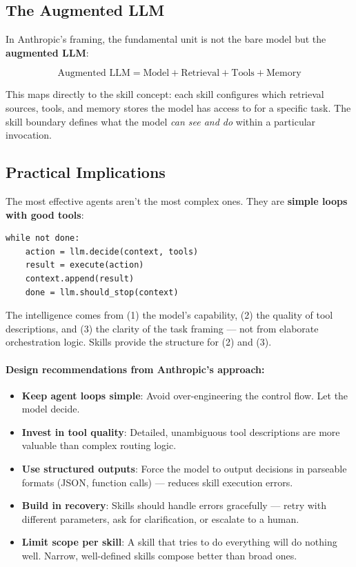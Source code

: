 \subsection{The Augmented LLM}
\label{the-augmented-llm}

In Anthropic’s framing, the fundamental unit is not the bare model but the \textbf{augmented LLM}:

\[
\text{Augmented LLM} = \text{Model} + \text{Retrieval} + \text{Tools} + \text{Memory}
\]

This maps directly to the skill concept: each skill configures which retrieval sources, tools, and memory stores the model has access to for a specific task. The skill boundary defines what the model \emph{can see and do} within a particular invocation.

\subsection{Practical Implications}
\label{practical-implications}

\begin{intuitionbox}
The most effective agents aren’t the most complex ones. They are \textbf{simple loops with good tools}:

\begin{lstlisting}[style=pythonstyle]
while not done:
    action = llm.decide(context, tools)
    result = execute(action)
    context.append(result)
    done = llm.should_stop(context)
\end{lstlisting}

The intelligence comes from (1) the model’s capability, (2) the quality of tool descriptions, and (3) the clarity of the task framing --- not from elaborate orchestration logic. Skills provide the structure for (2) and (3).
\end{intuitionbox}

\paragraph{Design recommendations from Anthropic’s approach:}
\label{design-recommendations-from-anthropics-approach}

\begin{itemize}
  \item \textbf{Keep agent loops simple}: Avoid over-engineering the control flow. Let the model decide.
  \item \textbf{Invest in tool quality}: Detailed, unambiguous tool descriptions are more valuable than complex routing logic.
  \item \textbf{Use structured outputs}: Force the model to output decisions in parseable formats (JSON, function calls) --- reduces skill execution errors.
  \item \textbf{Build in recovery}: Skills should handle errors gracefully --- retry with different parameters, ask for clarification, or escalate to a human.
  \item \textbf{Limit scope per skill}: A skill that tries to do everything will do nothing well. Narrow, well-defined skills compose better than broad ones.
\end{itemize}

